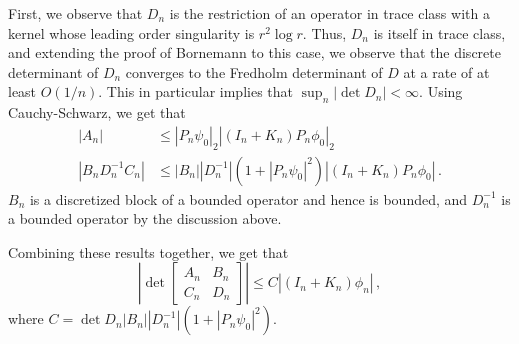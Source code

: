 First, we observe that $D_{n}$ is the restriction of an operator in trace class
with a kernel whose leading order singularity is $r^{2} \log{r}$. 
{\color{red} Thus, $D_{n}$ is itself in trace class, and extending the proof of Bornemann to this case,
we observe that the discrete determinant of $D_{n}$ converges to the Fredholm determinant
of $D$ at a rate of at least $O(1/n)$. This in particular implies that
$\sup_{n} |\det{D_{n}}| <\infty$}.
Using Cauchy-Schwarz, we get that
\begin{equation}
\begin{aligned}
|A_{n}| &\leq |P_{n} \psi_{0}|_{2} |(I_{n} + K_{n})P_{n} \phi_{0}|_{2} \\
|B_{n}D_{n}^{-1} C_{n}| &\leq |B_{n}||D_{n}^{-1}|(1+ |P_{n} \psi_{0}|^2) |(I_{n} + K_{n})P_{n} \phi_{0}| \,.
\end{aligned}
\end{equation}
$B_{n}$ is a discretized block of a bounded operator and hence is bounded, 
and $D_{n}^{-1}$ is a bounded operator by the discussion above. 

Combining these results together, we get that
\begin{equation}
\left| \det{\begin{bmatrix} A_{n} & B_{n} \\ C_{n} & D_{n} \end{bmatrix}} \right| \leq C |(I_{n} + K_{n})\phi_{n}| \, ,
\end{equation}
where $C = \det{D_{n}} |B_{n}||D_{n}^{-1}| (1 + |P_{n} \psi_{0}|^2)$.

